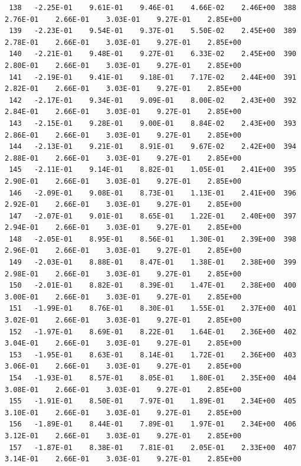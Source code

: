 \documentclass[10pt,letterpaper,notitlepage]{article}
\numberwithin{equation}{section}
\begin{document}
\begin{appendices}
{\begin{verbatim}
 138   -2.25E-01    9.61E-01    9.46E-01    4.66E-02    2.46E+00  388    2.76E-01    2.66E-01    3.03E-01    9.27E-01    2.85E+00
 139   -2.23E-01    9.54E-01    9.37E-01    5.50E-02    2.45E+00  389    2.78E-01    2.66E-01    3.03E-01    9.27E-01    2.85E+00
 140   -2.21E-01    9.48E-01    9.27E-01    6.33E-02    2.45E+00  390    2.80E-01    2.66E-01    3.03E-01    9.27E-01    2.85E+00
 141   -2.19E-01    9.41E-01    9.18E-01    7.17E-02    2.44E+00  391    2.82E-01    2.66E-01    3.03E-01    9.27E-01    2.85E+00
 142   -2.17E-01    9.34E-01    9.09E-01    8.00E-02    2.43E+00  392    2.84E-01    2.66E-01    3.03E-01    9.27E-01    2.85E+00
 143   -2.15E-01    9.28E-01    9.00E-01    8.84E-02    2.43E+00  393    2.86E-01    2.66E-01    3.03E-01    9.27E-01    2.85E+00
 144   -2.13E-01    9.21E-01    8.91E-01    9.67E-02    2.42E+00  394    2.88E-01    2.66E-01    3.03E-01    9.27E-01    2.85E+00
 145   -2.11E-01    9.14E-01    8.82E-01    1.05E-01    2.41E+00  395    2.90E-01    2.66E-01    3.03E-01    9.27E-01    2.85E+00
 146   -2.09E-01    9.08E-01    8.73E-01    1.13E-01    2.41E+00  396    2.92E-01    2.66E-01    3.03E-01    9.27E-01    2.85E+00
 147   -2.07E-01    9.01E-01    8.65E-01    1.22E-01    2.40E+00  397    2.94E-01    2.66E-01    3.03E-01    9.27E-01    2.85E+00
 148   -2.05E-01    8.95E-01    8.56E-01    1.30E-01    2.39E+00  398    2.96E-01    2.66E-01    3.03E-01    9.27E-01    2.85E+00
 149   -2.03E-01    8.88E-01    8.47E-01    1.38E-01    2.38E+00  399    2.98E-01    2.66E-01    3.03E-01    9.27E-01    2.85E+00
 150   -2.01E-01    8.82E-01    8.39E-01    1.47E-01    2.38E+00  400    3.00E-01    2.66E-01    3.03E-01    9.27E-01    2.85E+00
 151   -1.99E-01    8.76E-01    8.30E-01    1.55E-01    2.37E+00  401    3.02E-01    2.66E-01    3.03E-01    9.27E-01    2.85E+00
 152   -1.97E-01    8.69E-01    8.22E-01    1.64E-01    2.36E+00  402    3.04E-01    2.66E-01    3.03E-01    9.27E-01    2.85E+00
 153   -1.95E-01    8.63E-01    8.14E-01    1.72E-01    2.36E+00  403    3.06E-01    2.66E-01    3.03E-01    9.27E-01    2.85E+00
 154   -1.93E-01    8.57E-01    8.05E-01    1.80E-01    2.35E+00  404    3.08E-01    2.66E-01    3.03E-01    9.27E-01    2.85E+00
 155   -1.91E-01    8.50E-01    7.97E-01    1.89E-01    2.34E+00  405    3.10E-01    2.66E-01    3.03E-01    9.27E-01    2.85E+00
 156   -1.89E-01    8.44E-01    7.89E-01    1.97E-01    2.34E+00  406    3.12E-01    2.66E-01    3.03E-01    9.27E-01    2.85E+00
 157   -1.87E-01    8.38E-01    7.81E-01    2.05E-01    2.33E+00  407    3.14E-01    2.66E-01    3.03E-01    9.27E-01    2.85E+00

\end{verbatim}}
\end{appendices}
\end{document}
